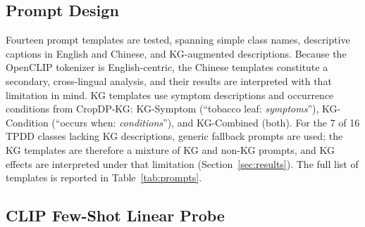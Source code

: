 \documentclass[10pt,a4paper]{article}
\begin{document}
\subsection{Prompt Design}

Fourteen prompt templates are tested, spanning simple class names, descriptive captions in English and Chinese, and KG-augmented descriptions. Because the OpenCLIP tokenizer is English-centric, the Chinese templates constitute a secondary, cross-lingual analysis, and their results are interpreted with that limitation in mind.
KG templates use symptom descriptions and occurrence conditions from CropDP-KG: KG-Symptom (``tobacco leaf: \textit{symptoms}''), KG-Condition (``occurs when: \textit{conditions}''), and KG-Combined (both).
For the 7 of 16 TPDD classes lacking KG descriptions, generic fallback prompts are used; the KG templates are therefore a mixture of KG and non-KG prompts, and KG effects are interpreted under that limitation (Section~\ref{sec:results}).
The full list of templates is reported in Table~\ref{tab:prompts}.

\subsection{CLIP Few-Shot Linear Probe}
\end{document}
